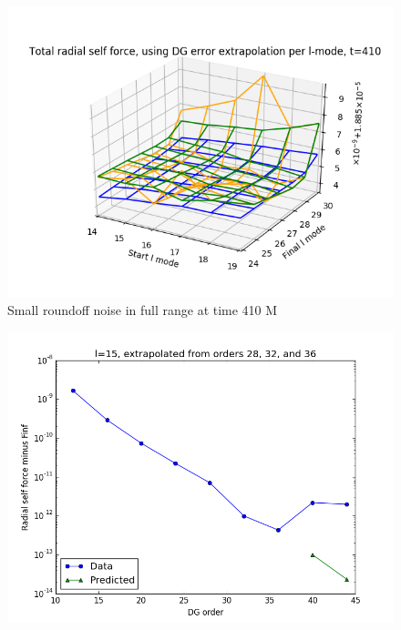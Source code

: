 \documentclass{article}
\begin{document}
\begin{figure}
\includegraphics{bestfinflminlmax234termst410fullrange}
\caption{Small roundoff noise in full range at time 410 M}
\end{figure}

\begin{figure}
\includegraphics{extrapolate7plot}
\end{figure}
\end{document}
